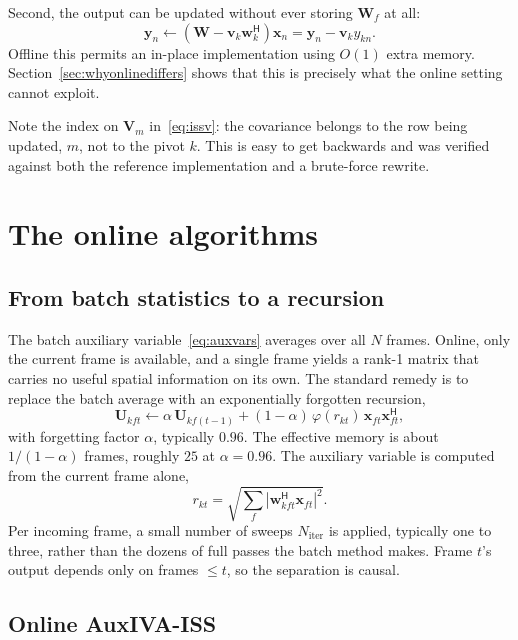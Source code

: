 \documentclass[11pt,a4paper]{article}
\newcommand{\W}{\boldsymbol{W}}
\newcommand{\V}{\boldsymbol{V}}
\newcommand{\U}{\boldsymbol{U}}
\newcommand{\x}{\boldsymbol{x}}
\newcommand{\y}{\boldsymbol{y}}
\newcommand{\w}{\boldsymbol{w}}
\newcommand{\vv}{\boldsymbol{v}}
\newcommand{\herm}{^{\mathsf{H}}}
\begin{document}
Second, the output can be updated without ever storing $\W_f$ at all:
%
\begin{equation}
\y_n \leftarrow (\W - \vv_k \w_k\herm)\x_n = \y_n - \vv_k y_{kn}.
\label{eq:issy}
\end{equation}
%
Offline this permits an in-place implementation using $O(1)$ extra memory.
Section~\ref{sec:whyonlinediffers} shows that this is precisely what the online
setting cannot exploit.

Note the index on $\V_m$ in~\eqref{eq:issv}: the covariance belongs to the row
being updated, $m$, not to the pivot $k$. This is easy to get backwards and was
verified against both the reference implementation and a brute-force rewrite.

\section{The online algorithms}

\subsection{From batch statistics to a recursion}

The batch auxiliary variable~\eqref{eq:auxvars} averages over all $N$ frames.
Online, only the current frame is available, and a single frame yields a rank-1
matrix that carries no useful spatial information on its own. The standard
remedy is to replace the batch average with an exponentially forgotten
recursion,
%
\begin{equation}
\U_{kft} \leftarrow \alpha\,\U_{kf(t-1)} + (1-\alpha)\,\varphi(r_{kt})\,
 \x_{ft}\x_{ft}\herm ,
\label{eq:recursion}
\end{equation}
%
with forgetting factor $\alpha$, typically $0.96$. The effective memory is about
$1/(1-\alpha)$ frames, roughly $25$ at $\alpha = 0.96$. The auxiliary variable
is computed from the current frame alone,
%
\begin{equation}
r_{kt} = \sqrt{\sum_f |\w_{kft}\herm \x_{ft}|^2}.
\end{equation}
%
Per incoming frame, a small number of sweeps $N_{\text{iter}}$ is applied,
typically one to three, rather than the dozens of full passes the batch method
makes. Frame $t$'s output depends only on frames $\le t$, so the separation is
causal.

\subsection{Online AuxIVA-ISS}
\end{document}

